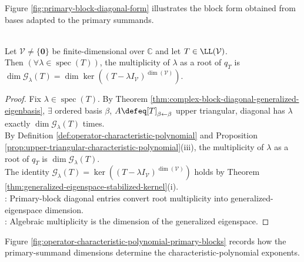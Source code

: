 Figure \ref{fig:primary-block-diagonal-form} illustrates the block form obtained from bases adapted to the primary summands.

\begin{illustrationfigure}[H]
  \centering
  
  \caption{Primary blocks: $A_j=\lambda_jI+N_j$, with $N_j$ strictly upper triangular.}
  \label{fig:primary-block-diagonal-form}
\end{illustrationfigure}

\begin{proposition} \label{prop:eigenvalue-algebraic-multiplicity-generalized-eigenspace} \\
Let $\mathcal{V}\neq\{\mathbf{0}\}$ be finite-dimensional over $\mathbb{C}$ and let $T\in\LL(\mathcal{V})$.\\
Then $(\forall\lambda\in\operatorname{spec}(T))$, the multiplicity of $\lambda$ as a root of $q_T$ is $\dim\mathcal{G}_{\lambda}(T)=\dim\ker((T-\lambda I_{\mathcal{V}})^{\dim(\mathcal{V})})$.
\begin{proof}
Fix $\lambda\in\operatorname{spec}(T)$. By Theorem \ref{thm:complex-block-diagonal-generalized-eigenbasis}, $\exists$ ordered basis $\beta$,  $A\defeq[T]_{\beta\leftarrow\beta}$ upper triangular, diagonal has $\lambda$ exactly $\dim\mathcal{G}_{\lambda}(T)$ times.\\
By Definition \ref{def:operator-characteristic-polynomial} and Proposition \ref{prop:upper-triangular-characteristic-polynomial}(iii), the multiplicity of $\lambda$ as a root of $q_T$ is $\dim\mathcal{G}_{\lambda}(T)$.\\
The identity $\mathcal{G}_{\lambda}(T)=\ker((T-\lambda I_{\mathcal{V}})^{\dim(\mathcal{V})})$ holds by Theorem \ref{thm:generalized-eigenspace-stabilized-kernel}(i).\\
: Primary-block diagonal entries convert root multiplicity into generalized-eigenspace dimension.\\
: Algebraic multiplicity is the dimension of the generalized eigenspace.
\end{proof}
\end{proposition}

Figure \ref{fig:operator-characteristic-polynomial-primary-blocks} records how the primary-summand dimensions determine the characteristic-polynomial exponents.

\begin{illustrationfigure}[H]
  \centering
  
  \caption{Each primary summand contributes $(z-\lambda_j)^{d_j}$, where $d_j=\dim \mathcal{G}_{\lambda_j}(T)$.}
  \label{fig:operator-characteristic-polynomial-primary-blocks}
\end{illustrationfigure}

